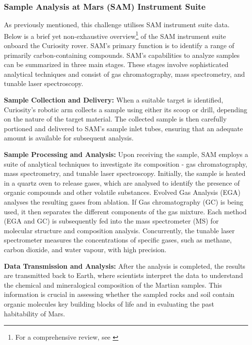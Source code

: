 \subsubsection{Sample Analysis at Mars (SAM) Instrument Suite}

As previously mentioned, this challenge utilises SAM instrument suite data. Below is a brief yet non-exhaustive overview\footnote{For a comprehensive review, see \cite{SAMPAPER_2012}} of the SAM instrument suite onboard the Curiosity rover. SAM’s primary function is to identify a range of primarily carbon-containing compounds. SAM’s capabilities to analyze samples can be summarized in three main stages. These stages involve sophisticated analytical techniques and consist of gas chromatography, mass spectrometry, and tunable laser spectroscopy.

\textbf{Sample Collection and Delivery:} When a suitable target is identified, Curiosity’s robotic arm collects a sample using either its scoop or drill, depending on the nature of the target material. The collected sample is then carefully portioned and delivered to SAM’s sample inlet tubes, ensuring that an adequate amount is available for subsequent analysis.

\textbf{Sample Processing and Analysis:} Upon receiving the sample, SAM employs a suite of analytical techniques to investigate its composition - gas chromatography, mass spectrometry, and tunable laser spectroscopy. Initially, the sample is heated in a quartz oven to release gases, which are analysed to identify the presence of organic compounds and other volatile substances. Evolved Gas Analysis (EGA) analyses the resulting gases from ablation. If Gas chromatography (GC) is being used, it then separates the different components of the gas mixture. Each method (EGA and GC) is subsequently fed into the mass spectrometer (MS) for molecular structure and composition analysis. Concurrently, the tunable laser spectrometer measures the concentrations of specific gases, such as methane, carbon dioxide, and water vapour, with high precision.

\textbf{Data Transmission and Analysis:} After the analysis is completed, the results are transmitted back to Earth, where scientists interpret the data to understand the chemical and mineralogical composition of the Martian samples. This information is crucial in assessing whether the sampled rocks and soil contain organic molecules key building blocks of life and in evaluating the past habitability of Mars.

